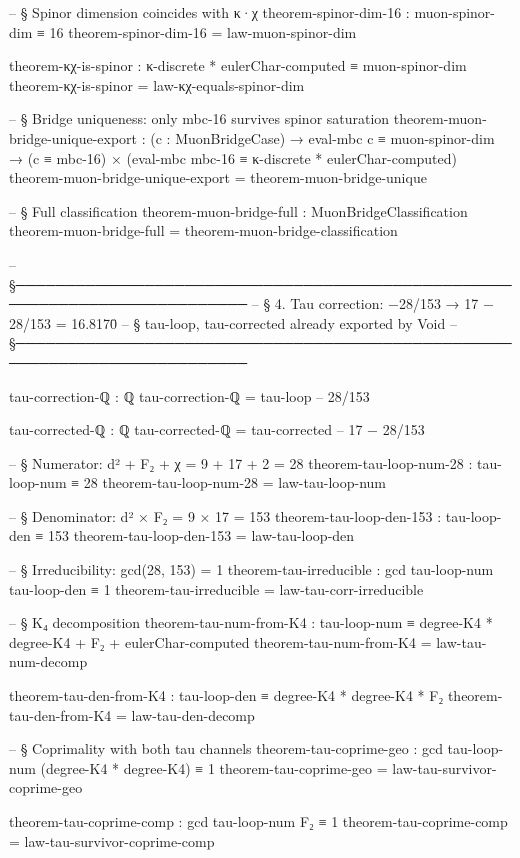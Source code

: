 \documentclass[11pt,a4paper]{book}
\begin{document}
\begin{code}
-- § Spinor dimension coincides with κ·χ
theorem-spinor-dim-16 : muon-spinor-dim ≡ 16
theorem-spinor-dim-16 = law-muon-spinor-dim

theorem-κχ-is-spinor : κ-discrete * eulerChar-computed ≡ muon-spinor-dim
theorem-κχ-is-spinor = law-κχ-equals-spinor-dim

-- § Bridge uniqueness: only mbc-16 survives spinor saturation
theorem-muon-bridge-unique-export :
  (c : MuonBridgeCase) →
  eval-mbc c ≡ muon-spinor-dim →
  (c ≡ mbc-16) × (eval-mbc mbc-16 ≡ κ-discrete * eulerChar-computed)
theorem-muon-bridge-unique-export = theorem-muon-bridge-unique

-- § Full classification
theorem-muon-bridge-full : MuonBridgeClassification
theorem-muon-bridge-full = theorem-muon-bridge-classification

-- §──────────────────────────────────────────────────────────────────────────
-- § 4. Tau correction: −28/153 → 17 − 28/153 = 16.8170̄
-- §    tau-loop, tau-corrected already exported by Void
-- §──────────────────────────────────────────────────────────────────────────

tau-correction-ℚ : ℚ
tau-correction-ℚ = tau-loop               -- 28/153

tau-corrected-ℚ : ℚ
tau-corrected-ℚ = tau-corrected           -- 17 − 28/153

-- § Numerator: d² + F₂ + χ = 9 + 17 + 2 = 28
theorem-tau-loop-num-28 : tau-loop-num ≡ 28
theorem-tau-loop-num-28 = law-tau-loop-num

-- § Denominator: d² × F₂ = 9 × 17 = 153
theorem-tau-loop-den-153 : tau-loop-den ≡ 153
theorem-tau-loop-den-153 = law-tau-loop-den

-- § Irreducibility: gcd(28, 153) = 1
theorem-tau-irreducible : gcd tau-loop-num tau-loop-den ≡ 1
theorem-tau-irreducible = law-tau-corr-irreducible

-- § K₄ decomposition
theorem-tau-num-from-K4 : tau-loop-num ≡ degree-K4 * degree-K4 + F₂ + eulerChar-computed
theorem-tau-num-from-K4 = law-tau-num-decomp

theorem-tau-den-from-K4 : tau-loop-den ≡ degree-K4 * degree-K4 * F₂
theorem-tau-den-from-K4 = law-tau-den-decomp

-- § Coprimality with both tau channels
theorem-tau-coprime-geo : gcd tau-loop-num (degree-K4 * degree-K4) ≡ 1
theorem-tau-coprime-geo = law-tau-survivor-coprime-geo

theorem-tau-coprime-comp : gcd tau-loop-num F₂ ≡ 1
theorem-tau-coprime-comp = law-tau-survivor-coprime-comp


\end{code}
\end{document}
